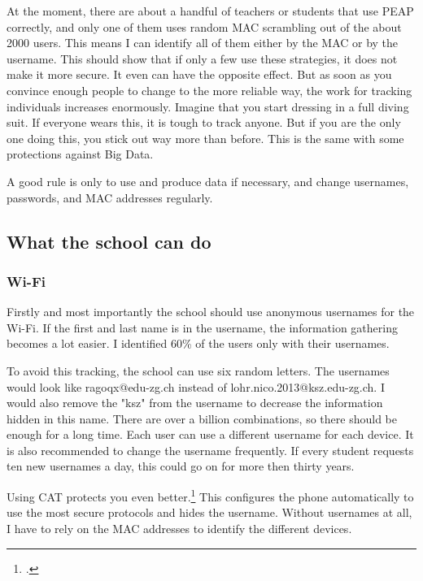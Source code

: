 \documentclass[paper=a4, fontsize=11pt]{article}
\begin{document}
At the moment, there are about a handful of teachers or students that use PEAP correctly, and only one of them uses random MAC scrambling out of the about 2000 users. This means I can identify all of them either by the MAC or by the username. This should show that if only a few use these strategies, it does not make it more secure. It even can have the opposite effect. But as soon as you convince enough people to change to the more reliable way, the work for tracking individuals increases enormously. Imagine that you start dressing in a full diving suit. If everyone wears this, it is tough to track anyone. But if you are the only one doing this, you stick out way more than before. This is the same with some protections against Big Data.

A good rule is only to use and produce data if necessary, and change usernames, passwords, and MAC addresses regularly.


\subsection{What the school can do}

\subsubsection{Wi-Fi}


Firstly and most importantly the school should use anonymous usernames for the Wi-Fi. If the first and last name is in the username, the information gathering becomes a lot easier. I identified 60\% of the users only with their usernames.



To avoid this tracking, the school can use six random letters. The usernames would look like ragoqx@edu-zg.ch instead of lohr.nico.2013@ksz.edu-zg.ch. I would also remove the "ksz" from the username to decrease the information hidden in this name. There are over a billion combinations, so there should be enough for a long time. Each user can use a different username for each device. It is also recommended to change the username frequently. If every student requests ten new usernames a day, this could go on for more then thirty years.

Using CAT protects you even better.\footcite{cateduroam}
This configures the phone automatically to use the most secure protocols and hides the username. Without usernames at all, I have to rely on the MAC addresses to identify the different devices.
\end{document}
